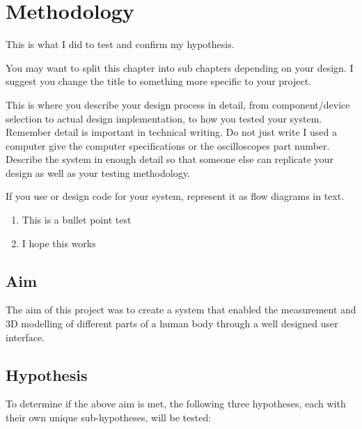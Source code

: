 \chapter{Methodology} \label{methodology}

This is what I did to test and confirm my hypothesis.


You may want to split this chapter into sub chapters depending on your design. I suggest you change
the title to something more specific to your project.

This is where you describe your design process in detail, from component/device selection to actual
design implementation, to how you tested your system. Remember detail is important in technical
writing. Do not just write I used a computer give the computer specifications or the oscilloscopes part
number. Describe the system in enough detail so that someone else can replicate your design as well
as your testing methodology.

If you use or design code for your system, represent it as flow diagrams in text.

\begin{enumerate}
\item This is a bullet point test
\item I hope this works
	
\end{enumerate}	

\section{Aim} \label{methodologyAim}
The aim of this project was to create a system that enabled the measurement and 3D modelling of different parts of a human body through a well designed user interface.

\section{Hypothesis} \label{methodologyHypothesis}
To determine if the above aim is met, the following three hypotheses, each with their own unique sub-hypotheses, will be tested:

